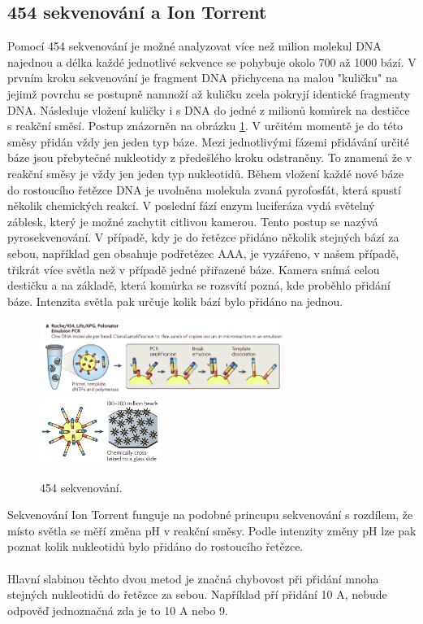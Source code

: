 \documentclass[czech,DP]{thesiskiv}
\numberwithin{equation}{section}
\begin{document}
\subsection{454 sekvenování a Ion Torrent}
Pomocí 454 sekvenování je možné analyzovat více než milion molekul DNA najednou a délka každé jednotlivé sekvence se pohybuje okolo 700 až 1000 bází. V prvním kroku sekvenování je fragment DNA přichycena na malou "kuličku" na jejimž povrchu se postupně namnoží až kuličku zcela pokryjí identické fragmenty DNA. Následuje vložení kuličky i s DNA do jedné z milionů komůrek na destičce s reakční směsí. Postup znázorněn na obrázku \ref{fig:sekvenovani_454}. V určitém momentě je do této směsy přidán vždy jen jeden typ báze. Mezi jednotlivými fázemi přidávání určité báze jsou přebytečné nukleotidy z předešlého kroku odstraněny. To znamená že v reakční směsy je vždy jen jeden typ nukleotidů. Během vložení každé nové báze do rostoucího řetězce DNA je uvolněna molekula zvaná pyrofosfát, která spustí několik chemických reakcí. V poslední fází enzym luciferáza vydá světelný záblesk, který je možné zachytit citlivou kamerou.  Tento postup se nazývá pyrosekvenování. V případě, kdy je do řetězce přidáno několik stejných bází za sebou, například gen obsahuje podřetězec AAA, je vyzářeno, v našem případě, třikrát více světla než v případě jedné přiřazené báze. Kamera snímá celou destičku a na základě, která komůrka se rozsvítí pozná, kde proběhlo přidání báze. Intenzita světla pak určuje kolik bází bylo přidáno na jednou. 


\begin{figure}[H]		
		\centering
		\includegraphics[width=300px]{./img/sekvenace_454_1.png}
		\includegraphics[width=150px]{./img/sekvenace_454_2.png}
		\caption{454 sekvenování. \cite{ngs_merzker}}
		\label{fig:sekvenovani_454}
\end{figure}

\noindent
Sekvenování Ion Torrent funguje na podobné princupu sekvenování s rozdílem, že místo světla se měří změna pH v reakční směsy. Podle intenzity změny pH lze pak poznat kolik nukleotidů bylo přidáno do rostoucího řetězce.
\\
\\
Hlavní slabinou těchto dvou metod je značná chybovost při přidání mnoha stejných nukleotidů do řetězce za sebou. Například pří přidání 10 A, nebude odpověď jednoznačná zda je to 10 A nebo 9.
\end{document}
